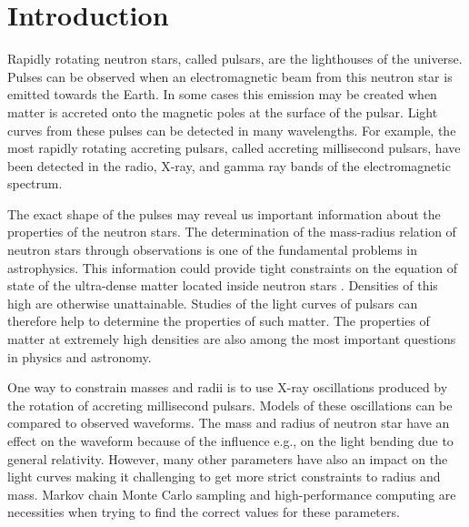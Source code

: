 \documentclass{wihuri}
\begin{document}
\newpage

\tableofcontents %

\newpage





\section*{Introduction}

Rapidly rotating neutron stars, called pulsars, are the lighthouses of the universe. Pulses can be observed when an electromagnetic beam from this neutron star is emitted towards the Earth.  In some cases this emission may be created when matter is accreted onto the magnetic poles at the surface of the pulsar. Light curves from these pulses can be detected in many wavelengths. For example, the most rapidly rotating accreting pulsars, called accreting millisecond pulsars, 
have been detected in the radio, X-ray, and gamma ray bands of the electromagnetic spectrum. %

The exact shape of the pulses may reveal us important information about the properties of the neutron stars. The determination of the mass-radius relation of neutron stars through observations is one of the fundamental problems in astrophysics. This information could provide tight constraints on the equation of state of the ultra-dense matter located inside neutron stars \cite{lattimer2007} \cite{hebeler}. Densities of this high are otherwise unattainable.
Studies of the light curves of pulsars can therefore help to determine the properties of such matter. The properties of matter at extremely high densities are also among the most important questions in physics and astronomy. 


One way to constrain masses and radii is to use X-ray oscillations produced by the rotation of accreting millisecond pulsars. Models of these oscillations can be compared to observed waveforms.  
The mass and radius of neutron star have an effect on the waveform because of the influence e.g., on the light bending due to general relativity. However, many other parameters have also an impact on the light curves making it challenging to get more strict constraints to radius and mass. Markov chain Monte Carlo sampling and high-performance computing are necessities when trying to find the correct values for these parameters. 
\end{document}
